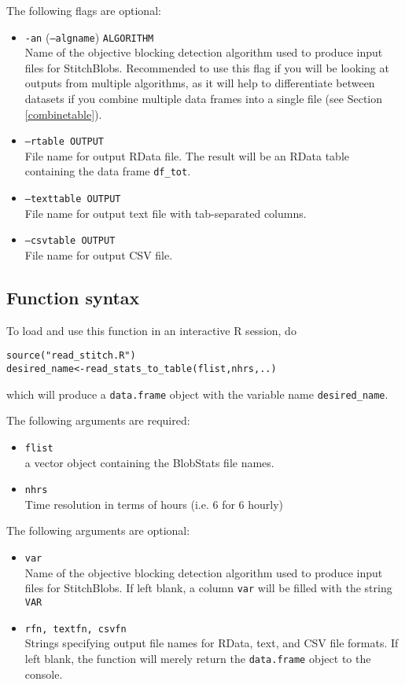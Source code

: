 \documentclass{article}
\begin{document}
The following flags are optional:
\begin{itemize}
\item[]\texttt{-an} (\texttt{--algname}) \texttt{ALGORITHM}\\ Name of the objective blocking detection algorithm used to produce input files for StitchBlobs. Recommended to use this flag if you will be looking at outputs from multiple algorithms, as it will help to differentiate between datasets if you combine multiple data frames into a single file (see Section \ref{combinetable}).
\item[] \texttt{--rtable OUTPUT}\\ File name for output RData file. The result will be an RData table containing the data frame \texttt{df\_tot}.
\item[] \texttt{--texttable OUTPUT}\\ File name for output text file with tab-separated columns.
\item[] \texttt{--csvtable OUTPUT}\\File name for output CSV file. 
\end{itemize}
\subsection{Function syntax}

To load and use  this function in an interactive R session, do
\begin{verbatim}
source("read_stitch.R")
desired_name<-read_stats_to_table(flist,nhrs,..)
\end{verbatim}

which will produce a \texttt{data.frame} object with the variable name \texttt{desired\_name}.

The following arguments are required:
\begin{itemize}
\item[] \texttt{flist}\\ a vector object containing the BlobStats file names.
\item[] \texttt{nhrs}\\ Time resolution in terms of hours (i.e. 6 for 6 hourly)
\end{itemize}

The following arguments are optional:
\begin{itemize}
\item[] \texttt{var}\\ Name of the objective blocking detection algorithm used to produce input files for StitchBlobs. If left blank, a column \texttt{var} will be filled with the string \texttt{VAR}
\item[] \texttt{rfn, textfn, csvfn}\\Strings specifying output file names for RData, text, and CSV file formats. If left blank, the function will merely return the \texttt{data.frame} object to the console.
\end{itemize}
\end{document}
